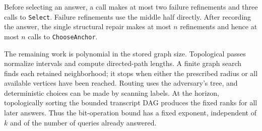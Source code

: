 Before selecting an answer, a call makes at most two failure refinements
and three calls to \texttt{Select}. Failure refinements use the middle
half directly. After recording the answer, the single structural repair
makes at most $n$ refinements and hence at most $n$ calls to
\texttt{ChooseAnchor}.

The remaining work is polynomial in the stored graph size. Topological
passes normalize intervals and compute directed-path lengths. A finite
graph search finds each retained neighborhood; it stops when either the
prescribed radius or all available vertices have been reached. Routing
uses the adversary's tree, and deterministic choices can be made by scanning
labels. At the horizon, topologically sorting the bounded transcript DAG
produces the fixed ranks for all later answers. Thus the bit-operation
bound has a fixed exponent, independent of $k$ and of the number of
queries already answered.
